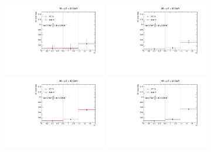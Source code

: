 

\begin{figure}[h!]
\centering
\includegraphics[width=0.4\textwidth]{FIGURES/BKG/chargeFlip/CFratesLOOSE___dataVSmc___PTbin0.pdf}
\includegraphics[width=0.4\textwidth]{FIGURES/BKG/chargeFlip/CFratesLOOSE___dataVSmc___PTbin1.pdf}
\vfill
\includegraphics[width=0.4\textwidth]{FIGURES/BKG/chargeFlip/CFratesLOOSE___dataVSmc___PTbin2.pdf}
\includegraphics[width=0.4\textwidth]{FIGURES/BKG/chargeFlip/CFratesLOOSE___dataVSmc___PTbin3.pdf}


\end{figure}
